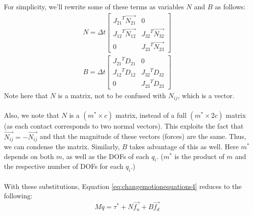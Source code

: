 For simplicity, we'll rewrite some of these terms as variables $N$ and $B$ as follows:
\begin{equation}
\label{eq:nbmatrix}
\begin{array}{cc}
N = \Delta{t}\left[\begin{matrix}{J_{21}}^T\vec{N_{21}} & 0 \\ {J_{12}}^T\vec{N_{12}} & {J_{32}}^T\vec{N_{32}} \\ 0 & {J_{23}}^T\vec{N_{23}} \end{matrix}\right] \\
B = \Delta{t}\left[\begin{matrix}{J_{21}}^TD_{21} & 0 \\ {J_{12}}^TD_{12} & {J_{32}}^TD_{32} \\ 0 & {J_{23}}^TD_{23} \end{matrix}\right]
\end{array}
\end{equation}
Note here that $N$ is a matrix, not to be confused with $N_{ij}$, which is a vector.
\\
\\
Also, we note that $N$ is a $(m^* \times c)$ matrix, instead of a full $(m^* \times 2c)$ matrix (as each contact corresponds to two normal vectors). This exploits the fact that $\vec{N_{ij}} = -\vec{N_{ij}}$ and that the magnitude of these vectors (forces) are the same. Thus, we can condense the matrix. Similarly, $B$ takes advantage of this as well. Here $m^*$ depends on both $m$, as well as the DOFs of each $q_i$. ($m^*$ is the product of $m$ and the respective number of DOFs for each $q_i$.)
\\
\\
With these substitutions, Equation \ref{eq:changemotionequations4} reduces to the following:
\begin{equation}
\label{eq:changemotionequations5}
M\dot{q} = \tau^* + N\vec{f_n} + B\vec{f_d}
\end{equation}